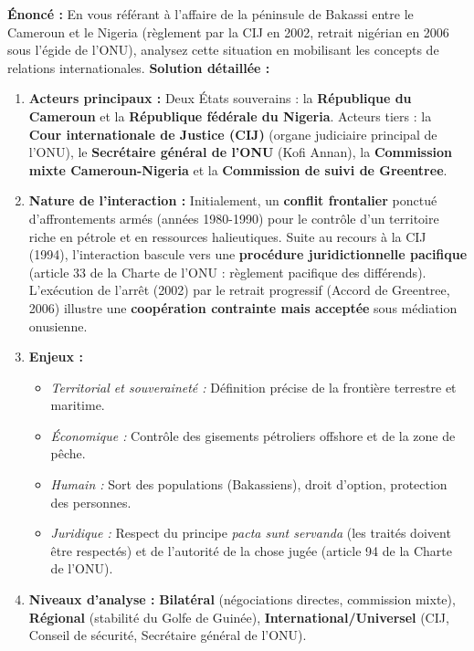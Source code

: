 \documentclass[11pt]{article}
\begin{document}
\begin{exoresolu}
\textbf{Énoncé :} En vous référant à l'affaire de la péninsule de Bakassi entre le Cameroun et le Nigeria (règlement par la CIJ en 2002, retrait nigérian en 2006 sous l'égide de l'ONU), analysez cette situation en mobilisant les concepts de relations internationales.
\tcblower
\textbf{Solution détaillée :}
\begin{enumerate}
    \item \textbf{Acteurs principaux :} Deux États souverains : la \textbf{République du Cameroun} et la \textbf{République fédérale du Nigeria}. Acteurs tiers : la \textbf{Cour internationale de Justice (CIJ)} (organe judiciaire principal de l'ONU), le \textbf{Secrétaire général de l'ONU} (Kofi Annan), la \textbf{Commission mixte Cameroun-Nigeria} et la \textbf{Commission de suivi de Greentree}.
    \item \textbf{Nature de l'interaction :} Initialement, un \textbf{conflit frontalier} ponctué d'affrontements armés (années 1980-1990) pour le contrôle d'un territoire riche en pétrole et en ressources halieutiques. Suite au recours à la CIJ (1994), l'interaction bascule vers une \textbf{procédure juridictionnelle pacifique} (article 33 de la Charte de l'ONU : règlement pacifique des différends). L'exécution de l'arrêt (2002) par le retrait progressif (Accord de Greentree, 2006) illustre une \textbf{coopération contrainte mais acceptée} sous médiation onusienne.
    \item \textbf{Enjeux :}
    \begin{itemize}
        \item \emph{Territorial et souveraineté :} Définition précise de la frontière terrestre et maritime.
        \item \emph{Économique :} Contrôle des gisements pétroliers offshore et de la zone de pêche.
        \item \emph{Humain :} Sort des populations (Bakassiens), droit d'option, protection des personnes.
        \item \emph{Juridique :} Respect du principe \emph{pacta sunt servanda} (les traités doivent être respectés) et de l'autorité de la chose jugée (article 94 de la Charte de l'ONU).
    \end{itemize}
    \item \textbf{Niveaux d'analyse :} \textbf{Bilatéral} (négociations directes, commission mixte), \textbf{Régional} (stabilité du Golfe de Guinée), \textbf{International/Universel} (CIJ, Conseil de sécurité, Secrétaire général de l'ONU).

\end{enumerate}
\end{exoresolu}
\end{document}
